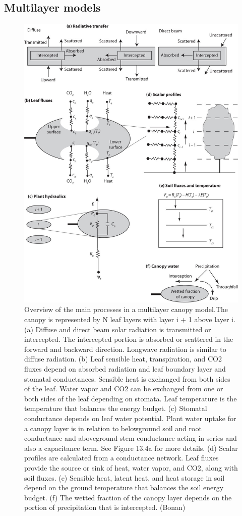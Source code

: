 \documentclass[12pt,oneside]{book}
\begin{document}
\subsection{Multilayer models}\label{multilayer-models}

\begin{figure}

{\centering \includegraphics[width=0.8\linewidth]{figures/chap3/f325_multilayer_process} 

}

\caption{Overview of the main processes in a multilayer canopy model.The canopy is represented by N leaf layers with layer i + 1 above layer i. (a) Diffuse and direct beam solar radiation is transmitted or intercepted. The intercepted portion is absorbed or scattered in the forward and backward direction. Longwave radiation is similar to diffuse radiation. (b) Leaf sensible heat, transpiration, and CO2 fluxes depend on absorbed radiation and leaf boundary layer and stomatal conductances. Sensible heat is exchanged from both sides of the leaf. Water vapor and CO2 can be exchanged from one or both sides of the leaf depending on stomata. Leaf temperature is the temperature that balances the energy budget. (c) Stomatal conductance depends on leaf water potential. Plant water uptake for a canopy layer is in relation to belowground soil and root conductance and aboveground stem conductance acting in series and also a capacitance term. See Figure 13.4a for more details. (d) Scalar profiles are calculated from a conductance network. Leaf fluxes provide the source or sink of heat, water vapor, and CO2, along with soil fluxes. (e) Sensible heat, latent heat, and heat storage in soil depend on the ground temperature that balances the soil energy budget. (f) The wetted fraction of the canopy layer depends on the portion of precipitation that is intercepted. (Bonan)}\label{fig:f325}
\end{figure}
\end{document}
